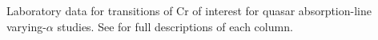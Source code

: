 Laboratory data for transitions of Cr of interest for quasar absorption-line varying-$\alpha$ studies. See  for full descriptions of each column.
